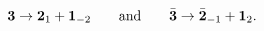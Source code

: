 \begin{equation}
{\bf 3}\rightarrow {\bf 2}_1 + {\bf 1}_{-2}
\qquad\hbox{and}\qquad
\bar{\bf 3}\rightarrow \bar{\bf 2}_{-1} + {\bf 1}_{2}.
\end{equation}

